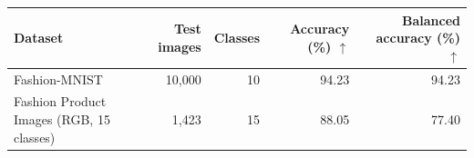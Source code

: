 \begin{tabular}{lrrrr}
\toprule
Dataset & Test images & Classes & Accuracy (\%) $\uparrow$ & Balanced accuracy (\%) $\uparrow$ \\
\midrule
Fashion-MNIST & 10,000 & 10 & 94.23 & 94.23 \\
Fashion Product Images (RGB, 15 classes) & 1,423 & 15 & 88.05 & 77.40 \\
\bottomrule
\end{tabular}